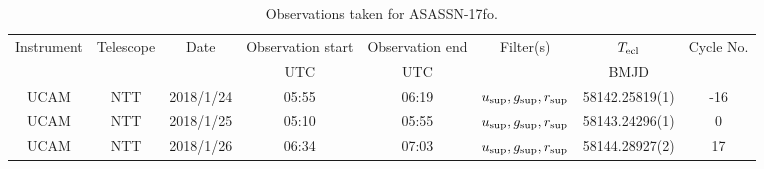 \begin{table}
	\begin{center}
		\begin{tabular}{cccccccc}
			\hline
			Instrument & Telescope & Date & Observation start & Observation end & Filter(s) & $T_{\rm ecl}$ & Cycle No. \\
			 &  &  & UTC & UTC &  & BMJD &  \\
			\hline
			\hline
			UCAM & NTT & 2018/1/24 & 05:55 & 06:19 & $u_{\rm sup},g_{\rm sup},r_{\rm sup}$ & 58142.25819(1)                                                                                                            &                                         -16 \\
			UCAM & NTT & 2018/1/25 & 05:10 & 05:55 & $u_{\rm sup},g_{\rm sup},r_{\rm sup}$ & 58143.24296(1)                                                                                                            &                                           0 \\
			UCAM & NTT & 2018/1/26 & 06:34 & 07:03 & $u_{\rm sup},g_{\rm sup},r_{\rm sup}$ & 58144.28927(2)                                                                                                            &                                          17 \\
		   \hline
		\end{tabular}
	\end{center}
	\caption{Observations taken for ASASSN-17fo.}
	\label{table:observing:observation logs ASASSN-17fo}
\end{table}
